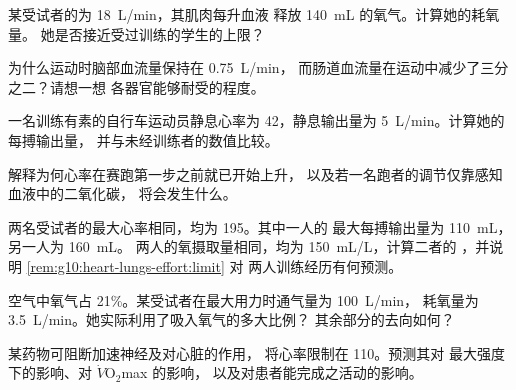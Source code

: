 \begin{exercise}[$\star\star$]\label{exo:g10:heart-lungs-effort:8}
某受试者的为 \qty{18}{L/min}，其肌肉每升血液
释放 \qty{140}{mL} 的氧气。计算她的耗氧量。
她是否接近受过训练的学生的上限？
\end{exercise}

\begin{exercise}[$\star\star$]\label{exo:g10:heart-lungs-effort:9}
为什么运动时脑部血流量保持在 \qty{0.75}{L/min}，
而肠道血流量在运动中减少了三分之二？请想一想
各器官能够耐受的程度。
\end{exercise}

\begin{exercise}[$\star\star$]\label{exo:g10:heart-lungs-effort:10}
一名训练有素的自行车运动员静息心率为 42，静息输出量为
\qty{5}{L/min}。计算她的每搏输出量，
并与未经训练者的数值比较。
\end{exercise}

\begin{exercise}[$\star\star$]\label{exo:g10:heart-lungs-effort:11}
解释为何心率在赛跑第一步之前就已开始上升，
以及若一名跑者的调节仅靠感知血液中的二氧化碳，
将会发生什么。
\end{exercise}

\begin{exercise}[$\star\star\star$]\label{exo:g10:heart-lungs-effort:12}
两名受试者的最大心率相同，均为 195。其中一人的
最大每搏输出量为 \qty{110}{mL}，另一人为 \qty{160}{mL}。
两人的氧摄取量相同，均为 \qty{150}{mL/L}，计算二者的
，并说明 \cref{rem:g10:heart-lungs-effort:limit} 对
两人训练经历有何预测。
\end{exercise}

\begin{exercise}[$\star\star\star$]\label{exo:g10:heart-lungs-effort:13}
空气中氧气占 21\%。某受试者在最大用力时通气量为 \qty{100}{L/min}，
耗氧量为 \qty{3.5}{L/min}。她实际利用了吸入氧气的多大比例？
其余部分的去向如何？
\end{exercise}

\begin{exercise}[$\star\star\star$]\label{exo:g10:heart-lungs-effort:14}
某药物可阻断加速神经及对心脏的作用，
将心率限制在 110。预测其对
最大强度下的影响、对 $\dot V\!\mathrm{O_2}$max 的影响，
以及对患者能完成之活动的影响。
\end{exercise}

